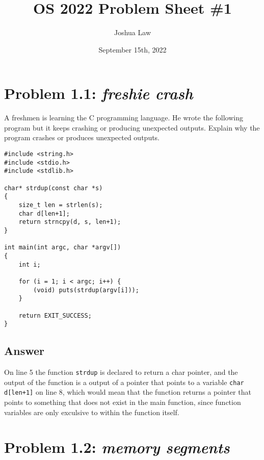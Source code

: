 \documentclass[
	12pt, %
]{fphw}
\title{OS 2022 Problem Sheet \#1} %
\author{Joshua Law} %
\date{September 15th, 2022} %
\institute{Jacobs University Bremen \\ Bachelor Of Computer Science} %
\begin{document}
\maketitle %


\section*{Problem 1.1: \emph{freshie crash}}

\begin{problem}
	A freshmen is learning the C programming language. He wrote the following program but it keeps
	crashing or producing unexpected outputs. Explain why the program crashes or produces unexpected outputs.\end{problem}
	\begin{lstlisting}[style=CStyle]
#include <string.h>
#include <stdio.h>
#include <stdlib.h>

char* strdup(const char *s)
{
	size_t len = strlen(s);
	char d[len+1];
	return strncpy(d, s, len+1);
}

int main(int argc, char *argv[])
{
	int i;

	for (i = 1; i < argc; i++) {
		(void) puts(strdup(argv[i]));
	}

	return EXIT_SUCCESS;
}\end{lstlisting}

\subsection*{Answer}

On line 5 the function \texttt{strdup} is declared to return a char pointer, and the output of the function is a output of a pointer that points to a variable \texttt{char d[len+1]} on line 8, which would mean that the function returns a pointer that points to something that does not exist in the main function, since function variables are only exculsive to within the function itself.


\section*{Problem 1.2: \emph{memory segments}}
\end{document}
